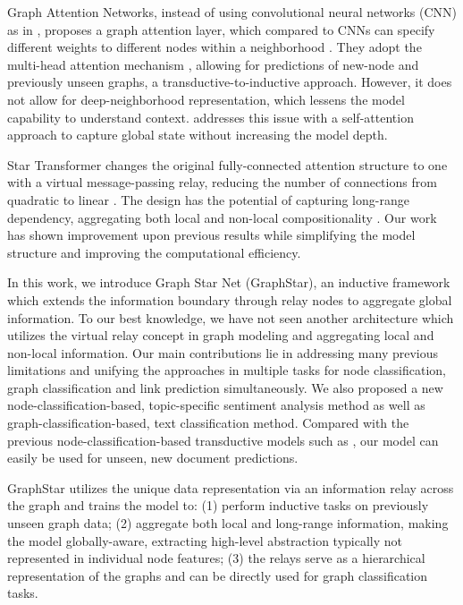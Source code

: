 \documentclass{article}
\begin{document}
Graph Attention Networks, instead of using convolutional neural networks (CNN) as in \cite{hamilton2017inductive}, proposes a graph attention layer, which compared to CNNs can specify different weights to different nodes within a neighborhood \cite{velivckovic2017graph}. They adopt the multi-head attention mechanism \cite{velivckovic2017graph,devlin2018bert}, allowing for predictions of new-node and previously unseen graphs, a transductive-to-inductive approach. However, it does not allow for deep-neighborhood representation, which lessens the model capability to understand context. \cite{wang2018non} addresses this issue with a self-attention approach to capture global state without increasing the model depth.

Star Transformer \cite{guo2019star} changes the original fully-connected attention structure to one with a virtual message-passing relay, reducing the number of connections from quadratic to linear \cite{guo2019star}. The design has the potential of capturing long-range dependency, aggregating both local and non-local compositionality \cite{guo2019star}. Our work has shown improvement upon previous results while simplifying the model structure and improving the computational efficiency. 

In this work, we introduce Graph Star Net (GraphStar), an inductive framework which extends the information boundary through relay nodes to aggregate global information. To our best knowledge, we have not seen another architecture which utilizes the virtual relay concept in graph modeling and aggregating local and non-local information. Our main contributions lie in addressing many previous limitations and unifying the approaches in multiple tasks for node classification, graph classification and link prediction simultaneously. We also proposed a new node-classification-based, topic-specific sentiment analysis method as well as graph-classification-based, text classification method. Compared with the previous node-classification-based transductive models such as \cite{DBLP:journals/corr/abs-1902-07153,yao2018graph}, our model can easily be used for unseen, new document predictions.

GraphStar utilizes the unique data representation via an information relay across the graph and trains the model to: (1) perform inductive tasks on previously unseen graph data; (2) aggregate both local and long-range information, making the model globally-aware, extracting high-level abstraction typically not represented in individual node features; (3) the relays serve as a hierarchical representation of the graphs and can be directly used for graph classification tasks.
\end{document}

